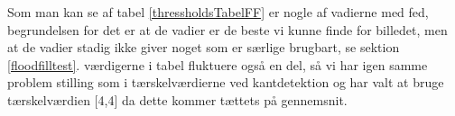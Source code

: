 Som man kan se af tabel \ref{thressholdsTabelFF} er nogle af vadierne med fed, begrundelsen for det er
at de vadier er de beste vi kunne finde for billedet, men at de vadier stadig
ikke giver noget som er særlige brugbart, se sektion \ref{floodfilltest}.
værdigerne i tabel fluktuere også en del, så vi har igen samme problem stilling
som i tærskelværdierne ved kantdetektion og har valt at bruge tærskelværdien
[4,4] da dette kommer tættets på gennemsnit.
